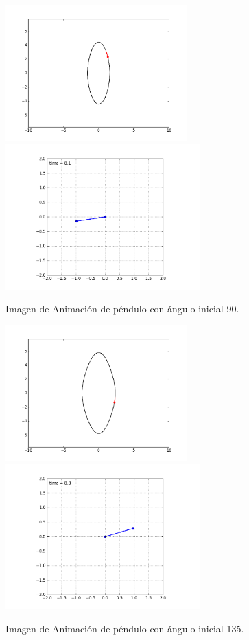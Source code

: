 \documentclass[12pt]{article}
\begin{document}
\begin{figure}[H]
\centering
\includegraphics[width=7cm]{Fase90.png}
\includegraphics[width=7.5cm]{Pendulo90.png}
\caption{Imagen de Animación de péndulo con ángulo inicial 90.}
\end{figure}

\begin{figure}[H]
\centering
\includegraphics[width=7cm]{Fase135.png}
\includegraphics[width=7.5cm]{Pendulo135.png}
\caption{Imagen de Animación de péndulo con ángulo inicial 135.}
\end{figure}
\end{document}
